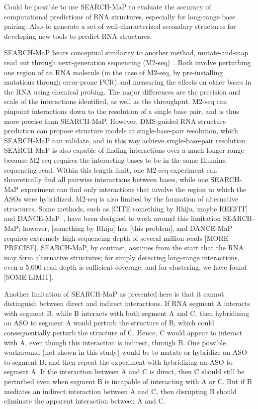 \documentclass[main.tex]{subfiles}
\begin{document}
Could be possible to use SEARCH-MaP to evaluate the accuracy of computational predictions of RNA structures, especially for long-range base pairing.
Also to generate a set of well-characterized secondary structures for developing new tools to predict RNA structures.

SEARCH-MaP bears conceptual similarity to another method, mutate-and-map read out through next-generation sequencing (M2-seq)~\cite{Cheng2017}. Both involve perturbing one region of an RNA molecule (in the case of M2-seq, by pre-installing mutations through error-prone PCR) and measuring the effects on other bases in the RNA using chemical probing. The major differences are the precision and scale of the interactions identified, as well as the throughput. M2-seq can pinpoint interactions down to the resolution of a single base pair, and is thus more precise than SEARCH-MaP. However, DMS-guided RNA structure prediction can propose structure models at single-base-pair resolution, which SEARCH-MaP can validate, and in this way achieve single-base-pair resolution. SEARCH-MaP is also capable of finding interactions over a much longer range because M2-seq requires the interacting bases to be in the same Illumina sequencing read. Within this length limit, one M2-seq experiment can theoretically find all pairwise interactions between bases, while one SEARCH-MaP experiment can find only interactions that involve the region to which the ASOs were hybridized. M2-seq is also limited by the formation of alternative structures. Some methods, such as [CITE something by Rhiju, maybe REEFIT] and DANCE-MaP~\cite{Olson2022}, have been designed to work around this limitation SEARCH-MaP; however, [something by Rhiju] has [this problem], and DANCE-MaP requires extremely high sequencing depth of several million reads [MORE PRECISE]. SEARCH-MaP, by contrast, assumes from the start that the RNA may form alternative structures; for simply detecting long-range interactions, even a 5,000 read depth is sufficient coverage; and for clustering, we have found [SOME LIMIT].

Another limitation of SEARCH-MaP as presented here is that it cannot distinguish between direct and indirect interactions. If RNA segment A interacts with segment B, while B interacts with both segment A and C, then hybridizing an ASO to segment A would perturb the structure of B, which could consequentially perturb the structure of C. Hence, C would appear to interact with A, even though this interaction is indirect, through B. One possible workaround (not shown in this study) would be to mutate or hybridize an ASO to segment B, and then repeat the experiment with hybridizing an ASO to segment A. If the interaction between A and C is direct, then C should still be perturbed even when segment B is incapable of interacting with A or C. But if B mediates an indirect interaction between A and C, then disrupting B should eliminate the apparent interaction between A and C.
\end{document}
